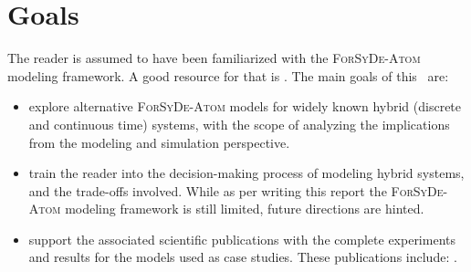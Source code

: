 
\section{Goals}
\label{sec:goals}

The reader is assumed to have been familiarized with the \textsc{ForSyDe-Atom} modeling framework. A good resource for that is . The main goals of this \SelfRef\ are:
\begin{itemize}
\item explore alternative \textsc{ForSyDe-Atom} models for widely known hybrid (discrete and continuous time) systems, with the scope of analyzing the implications from the modeling and simulation perspective.
\item train the reader into the decision-making process of modeling hybrid systems, and the trade-offs involved. While as per writing this report the \textsc{ForSyDe-Atom} modeling framework is still limited, future directions are hinted.
\item support the associated scientific publications with the complete experiments and results for the models used as case studies. These publications include: \cite{ungureanu18a}.
\end{itemize}


